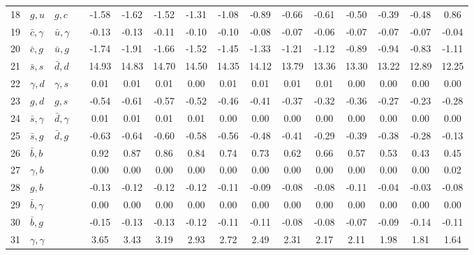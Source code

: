 \begin{tabularx}{\textwidth}{rXXX@{}S@{}S@{}S@{}S@{}S@{}S@{}S@{}S@{}S@{}S@{}S@{}S}
 18 & $g,u$            & $g,c$            &                 & -1.58 & -1.62 & -1.52 & -1.31 & -1.08 & -0.89 & -0.66 & -0.61 & -0.50 & -0.39 & -0.48 &  0.86 \\
 19 & $\bar c,\gamma$  & $\bar u,\gamma$  &                 & -0.13 & -0.13 & -0.11 & -0.10 & -0.10 & -0.08 & -0.07 & -0.06 & -0.07 & -0.07 & -0.07 & -0.04 \\
 20 & $\bar c, g$      & $\bar u, g$      &                 & -1.74 & -1.91 & -1.66 & -1.52 & -1.45 & -1.33 & -1.21 & -1.12 & -0.89 & -0.94 & -0.83 & -1.11 \\
 21 & $\bar s, s$      & $\bar d, d$      &                 & 14.93 & 14.83 & 14.70 & 14.50 & 14.35 & 14.12 & 13.79 & 13.36 & 13.30 & 13.22 & 12.89 & 12.25 \\
 22 & $\gamma, d$      & $\gamma, s$      &                 &  0.01 &  0.01 &  0.01 &  0.00 &  0.01 &  0.01 &  0.01 &  0.01 &  0.00 &  0.00 &  0.00 &  0.00 \\
 23 & $g,d$            & $g,s$            &                 & -0.54 & -0.61 & -0.57 & -0.52 & -0.46 & -0.41 & -0.37 & -0.32 & -0.36 & -0.27 & -0.23 & -0.28 \\
 24 & $\bar s,\gamma$  & $\bar d,\gamma$  &                 &  0.01 &  0.01 &  0.01 &  0.01 &  0.00 &  0.00 &  0.00 &  0.00 &  0.00 &  0.00 &  0.00 &  0.00 \\
 25 & $\bar s,g$       & $\bar d, g$      &                 & -0.63 & -0.64 & -0.60 & -0.58 & -0.56 & -0.48 & -0.41 & -0.29 & -0.39 & -0.38 & -0.28 & -0.13 \\
 26 & $\bar b,b$       &                  &                 &  0.92 &  0.87 &  0.86 &  0.84 &  0.74 &  0.73 &  0.62 &  0.66 &  0.57 &  0.53 &  0.43 &  0.45 \\
 27 & $\gamma, b$      &                  &                 &  0.00 &  0.00 &  0.00 &  0.00 &  0.00 &  0.00 &  0.00 &  0.00 &  0.00 &  0.00 &  0.00 &  0.02 \\
 28 & $g,b$            &                  &                 & -0.13 & -0.12 & -0.12 & -0.12 & -0.11 & -0.09 & -0.08 & -0.08 & -0.11 & -0.04 & -0.03 & -0.08 \\
 29 & $\bar b,\gamma$  &                  &                 &  0.00 &  0.00 &  0.00 &  0.00 &  0.00 &  0.00 &  0.00 &  0.00 &  0.00 &  0.00 &  0.00 &  0.00 \\
 30 & $\bar b,g$       &                  &                 & -0.15 & -0.13 & -0.13 & -0.12 & -0.11 & -0.11 & -0.08 & -0.08 & -0.07 & -0.09 & -0.14 & -0.11 \\
 31 & $\gamma,\gamma$  &                  &                 &  3.65 &  3.43 &  3.19 &  2.93 &  2.72 &  2.49 &  2.31 &  2.17 &  2.11 &  1.98 &  1.81 &  1.64 \\

\end{tabularx}
